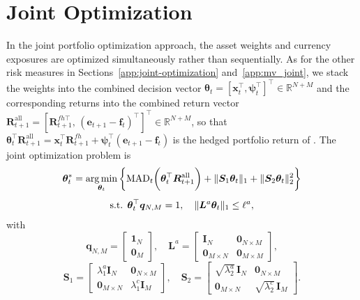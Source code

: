 \section{Joint Optimization} \label{app:mad_joint}

In the joint portfolio optimization approach, the asset weights and currency exposures are optimized simultaneously
rather than sequentially. As for the other risk measures in Sections~\ref{app:joint-optimization}
and~\ref{app:mv_joint}, we stack the weights into the combined decision vector
$\bm{\theta}_t = [\bm{x}_t^\top, \bm{\psi}_t^\top]^\top \in \mathbb{R}^{N+M}$ and the corresponding returns into the
combined return vector
$\bm{R}^{\text{all}}_{t+1} = [\bm{R}^{fh\top}_{t+1},\, (\bm{e}_{t+1} - \bm{f}_t)^\top]^\top \in \mathbb{R}^{N+M}$,
so that $\bm{\theta}_t^\top \bm{R}^{\text{all}}_{t+1} = \bm{x}_t^\top \bm{R}^{fh}_{t+1}
+ \bm{\psi}_t^\top (\bm{e}_{t+1} - \bm{f}_t)$ is the hedged portfolio return of .
The joint optimization problem is
\begin{equation} \label{eq:mad_joint_obj}
\begin{gathered}
    \bm{\theta}_t^* = \operatorname*{arg\,min}_{\bm{\theta}_t} \left\{ \text{MAD}_t\biggl( \bm{\theta}_t^\top \bm{R}^{\text{all}}_{t+1} \biggr)
    + \|\bm{S}_1 \bm{\theta}_t\|_1 + \|\bm{S}_2 \bm{\theta}_t\|_2^2 \right\} \\[4pt]
    \text{s.t. } \bm{\theta}_t^\top \bm{q}_{N,M} = 1, \quad \|\bm{L}^a \bm{\theta}_t\|_1 \le \ell^a,
\end{gathered}
\end{equation}
with
\begin{equation*}
    \bm{q}_{N,M} = \begin{bmatrix} \bm{1}_N \\ \bm{0}_M \end{bmatrix}, \quad
    \bm{L}^a = \begin{bmatrix} \bm{I}_N & \bm{0}_{N \times M} \\ \bm{0}_{M \times N} & \bm{0}_{M \times M} \end{bmatrix},
\end{equation*}
\begin{equation*}
    \bm{S}_1 = \begin{bmatrix} \lambda_1^a \bm{I}_N & \bm{0}_{N \times M} \\ \bm{0}_{M \times N} & \lambda_1^c \bm{I}_M \end{bmatrix}, \quad
    \bm{S}_2 = \begin{bmatrix} \sqrt{\lambda_2^a}\, \bm{I}_N & \bm{0}_{N \times M} \\ \bm{0}_{M \times N} & \sqrt{\lambda_2^c}\, \bm{I}_M \end{bmatrix}.
\end{equation*}
